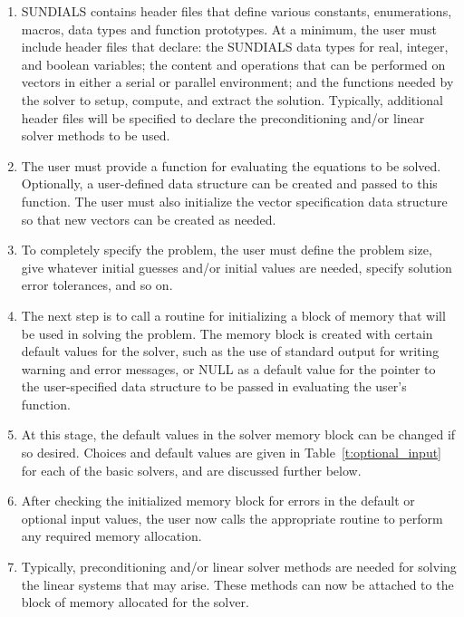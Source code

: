 \begin{enumerate}

\item \label{sun_headers}
SUNDIALS contains header files that define various constants,
enumerations, macros, data types and function prototypes.  At a
minimum, the user must include header files that declare: the SUNDIALS
data types for real, integer, and boolean variables; the content and
operations that can be performed on vectors in either a serial or
parallel environment; and the functions needed by the solver to
setup, compute, and extract the solution. Typically, additional header
files will be specified to declare the preconditioning and/or linear
solver methods to be used.

\item \label{sun_problem}
The user must provide a function for evaluating the equations to be
solved. Optionally, a user-defined data structure can be created and
passed to this function. The user must also initialize the vector
specification data structure so that new vectors can be created as needed.

\item \label{sun_size}
To completely specify the problem, the user must define the problem
size, give whatever initial guesses and/or initial values are
needed, specify solution error tolerances, and so on. 

\item \label{sun_create}
The next step is to call a routine for initializing a block of memory
that will be used in solving the problem. The memory block is created
with certain default values for the solver, such as the use of
standard output for writing warning and error messages, or NULL
as a default value for the pointer to the user-specified data
structure to be passed in evaluating the user's function.

\item \label{sun_set}
At this stage, the default values in the solver memory block can be
changed if so desired. Choices and default values are given in
Table~\ref{t:optional_input} for each of the basic solvers, and
are discussed further below.

\item \label{sun_malloc}
After checking the initialized memory block for
errors in the default or optional input values, the user now calls 
the appropriate routine to perform any required
memory allocation.

\item \label{sun_linear}
Typically, preconditioning and/or linear solver methods are needed for
solving the linear systems that may arise. These methods can now be
attached to the block of memory allocated for the solver.


\end{enumerate}
